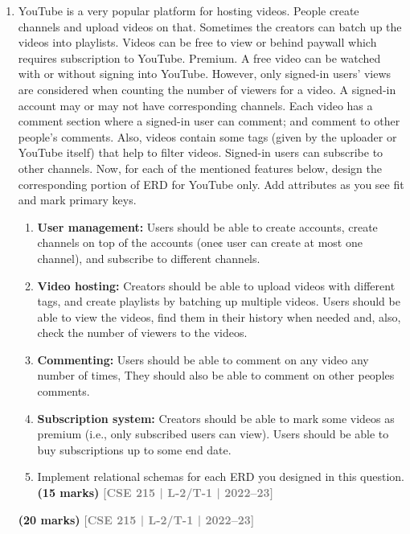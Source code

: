 \documentclass[12pt,a3paper]{article}
\newcommand{\yr}[1]{\hfill\textcolor{gray}{\small\textbf{[#1]}}}
\newcommand{\mk}[1]{\textcolor{orange!70!black}{\small\textbf{(#1 marks)}}}
\begin{document}
\begin{enumerate}
\begin{center}
\end{center}


\mk{5} \yr{CSE 215 | L-2/T-2 | 2021--22}

\item YouTube is a very popular platform for hosting videos. People create channels and
upload videos on that. Sometimes the creators can batch up the videos into playlists.
Videos can be free to view or behind paywall which requires subscription to YouTube.
Premium. A free video can be watched with or without signing into YouTube. However,
only signed-in users' views are considered when counting the number of viewers for a
video. A signed-in account may or may not have corresponding channels. Each video has
a comment section where a signed-in user can comment; and comment to other people’s
comments. Also, videos contain some tags (given by the uploader or YouTube itself) that
help to filter videos. Signed-in users can subscribe to other channels. Now, for each of the
mentioned features below, design the corresponding portion of ERD for YouTube only.
Add attributes as you see fit and mark primary keys.
\begin{enumerate}
  \item \textbf{User management:} Users should be able to create accounts, create channels on top of
the accounts (one¢ user can create at most one channel), and subscribe to different
channels.
  \item \textbf{Video hosting:} Creators should be able to upload videos with different tags, and
create playlists by batching up multiple videos. Users should be able to view the videos,
find them in their history when needed and, also, check the number of viewers to the
videos.
  \item \textbf{Commenting:} Users should be able to comment on any video any number of times,
They should also be able to comment on other peoples comments.
  \item \textbf{Subscription system:} Creators should be able to mark some videos as premium (i.e.,
only subscribed users can view). Users should be able to buy subscriptions up to some
end date.
\item Implement relational schemas for each ERD you designed in this question.
\mk{15} \yr{CSE 215 | L-2/T-1 | 2022--23}
\end{enumerate}
\mk{20} \yr{CSE 215 | L-2/T-1 | 2022--23}




\end{enumerate}
\end{document}
